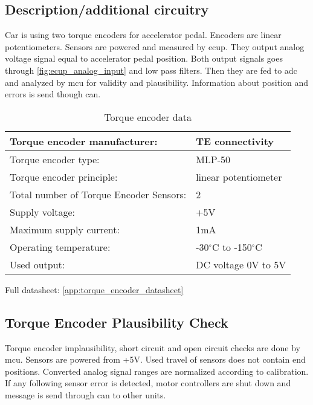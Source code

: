 \subsection{Description/additional circuitry}
Car is using two torque encoders for accelerator pedal. Encoders are linear potentiometers. Sensors are powered and measured by \gls{ecup}. They output analog voltage signal equal to accelerator pedal position. Both output signals goes through \ref{fig:ecup_analog_input} and low pass filters. Then they are fed to \gls{adc} and analyzed by \gls{mcu} for validity and plausibility. Information about position and errors is send though \gls{can}.

\begin{table}[H]
	\centering
	\caption{Torque encoder data}
	\begin{tabularx}{\textwidth}{|X|X|}
		\hline
		Torque encoder manufacturer: & TE connectivity  \\[\TableSize]\hline
		Torque encoder type: & MLP-50  \\[\TableSize]\hline
		Torque encoder principle: & linear potentiometer  \\[\TableSize]\hline
		Total number of Torque Encoder Sensors: & 2  \\[\TableSize]\hline
		Supply voltage: & +5V  \\[\TableSize]\hline
		Maximum supply current: & 1mA  \\[\TableSize]\hline
		Operating temperature: & -30$^\circ$C to -150$^\circ$C  \\[\TableSize]\hline
		Used output: & DC voltage 0V to 5V\\[\TableSize]\hline
	\end{tabularx}%
	\label{tab:encoder-general}%
\end{table}%

Full datasheet: \ref{app:torque_encoder_datasheet}

\subsection{Torque Encoder Plausibility Check}
Torque encoder implausibility, short circuit and open circuit checks are done by \gls{mcu}. Sensors are powered from +5V. Used travel of sensors does not contain end positions. Converted analog signal ranges are normalized according to calibration.
If any following sensor error is detected, motor controllers are shut down and message is send through \gls{can} to other units.

